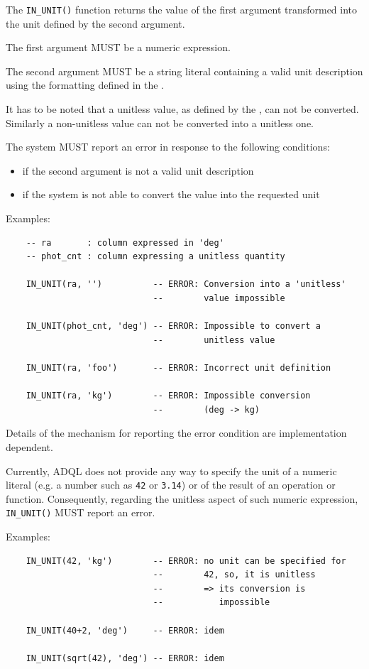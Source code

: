 \documentclass[11pt,a4paper]{ivoa}
\begin{document}
The \verb:IN_UNIT(): function returns the value of the first argument
transformed into the unit defined by the second argument.

The first argument MUST be a numeric expression.

The second argument MUST be a string literal containing a valid unit
description using the formatting defined in the \VOUnitSpec{}.

It has to be noted that a unitless value, as defined by the \VOUnitSpec{}, can not
be converted. Similarly a non-unitless value can not be converted into a
unitless one.

The system MUST report an error in response to the following conditions:
\begin{itemize}
    \item if the second argument is not a valid unit description
    \item if the system is not able to convert the value into the requested unit
\end{itemize}

Examples:

\begin{verbatim}
    -- ra       : column expressed in 'deg'
    -- phot_cnt : column expressing a unitless quantity

    IN_UNIT(ra, '')          -- ERROR: Conversion into a 'unitless'
                             --        value impossible

    IN_UNIT(phot_cnt, 'deg') -- ERROR: Impossible to convert a
                             --        unitless value

    IN_UNIT(ra, 'foo')       -- ERROR: Incorrect unit definition

    IN_UNIT(ra, 'kg')        -- ERROR: Impossible conversion
                             --        (deg -> kg)
\end{verbatim}

Details of the mechanism for reporting the error condition are implementation
dependent.

Currently, ADQL does not provide any way to specify the unit of a numeric
literal (e.g. a number such as \verb:42: or \verb:3.14:) or of the result of an
operation or function. Consequently, regarding the unitless aspect of such
numeric expression, \verb:IN_UNIT(): MUST report an error.

Examples:

\begin{verbatim}
    IN_UNIT(42, 'kg')        -- ERROR: no unit can be specified for
                             --        42, so, it is unitless
                             --        => its conversion is
                             --           impossible

    IN_UNIT(40+2, 'deg')     -- ERROR: idem

    IN_UNIT(sqrt(42), 'deg') -- ERROR: idem
\end{verbatim}
\end{document}
